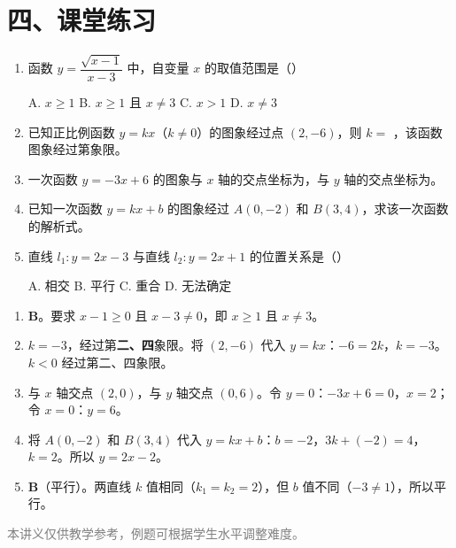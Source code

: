 \documentclass[12pt, a4paper]{ctexart}
\begin{document}
\section*{\textcolor{tipgreen}{四、课堂练习}}

\begin{enumerate}[leftmargin=2em]
  \item 函数 $y = \dfrac{\sqrt{x-1}}{x-3}$ 中，自变量 $x$ 的取值范围是\quad（\quad）

  A. $x \geq 1$ \quad B. $x \geq 1$ 且 $x \neq 3$ \quad C. $x > 1$ \quad D. $x \neq 3$

  \item 已知正比例函数 $y = kx$（$k\neq 0$）的图象经过点 $(2, -6)$，则 $k = $ \underline{\qquad}，该函数图象经过第\underline{\qquad}象限。

  \item 一次函数 $y = -3x + 6$ 的图象与 $x$ 轴的交点坐标为\underline{\qquad}，与 $y$ 轴的交点坐标为\underline{\qquad}。

  \item 已知一次函数 $y = kx + b$ 的图象经过 $A(0, -2)$ 和 $B(3, 4)$，求该一次函数的解析式。

  \item 直线 $l_1: y = 2x - 3$ 与直线 $l_2: y = 2x + 1$ 的位置关系是\quad（\quad）

  A. 相交 \quad B. 平行 \quad C. 重合 \quad D. 无法确定
\end{enumerate}

\begin{knowledgebox}[参考答案]
\begin{enumerate}[leftmargin=2em]
  \item \textbf{B}。\quad 要求 $x - 1 \geq 0$ 且 $x - 3 \neq 0$，即 $x \geq 1$ 且 $x \neq 3$。

  \item $k = -3$，经过第\textbf{二、四}象限。\quad 将 $(2, -6)$ 代入 $y = kx$：$-6 = 2k$，$k = -3$。$k<0$ 经过第二、四象限。

  \item 与 $x$ 轴交点 $(2, 0)$，与 $y$ 轴交点 $(0, 6)$。\quad 令 $y=0$：$-3x+6=0$，$x=2$；令 $x=0$：$y=6$。

  \item 将 $A(0,-2)$ 和 $B(3,4)$ 代入 $y = kx + b$：$b = -2$，$3k + (-2) = 4$，$k = 2$。所以 $y = 2x - 2$。

  \item \textbf{B}（平行）。\quad 两直线 $k$ 值相同（$k_1 = k_2 = 2$），但 $b$ 值不同（$-3 \neq 1$），所以平行。
\end{enumerate}
\end{knowledgebox}

\vfill
\begin{center}
\small\textcolor{gray}{本讲义仅供教学参考，例题可根据学生水平调整难度。}
\end{center}
\end{document}
